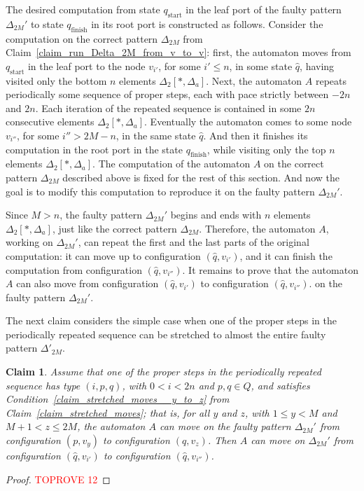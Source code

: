 \documentclass[12pt,a4paper]{article}
\newtheorem{claim}{Claim}
\theoremstyle{definition}
\begin{document}
The desired computation
from state $q_{\text{start}}$ in the leaf port of the faulty pattern $\Delta_{2M}'$
to state $q_{\text{finish}}$ in its root port
is constructed as follows.
Consider the computation on the correct pattern $\Delta_{2M}$
from Claim~\ref{claim_run_Delta_2M_from_v_to_v}:
first, the automaton moves from $q_{\text{start}}$ in the leaf port
to the node $v_{i'}$, for some $i' \leqslant n$, in some state $\widehat{q}$,
having visited only the bottom $n$ elements $\Delta_2[*,\Delta_a]$.
Next, the automaton $A$ repeats periodically
some sequence of proper steps, each with pace strictly between $-2n$ and $2n$.
Each iteration of the repeated sequence
is contained in some $2n$ consecutive elements $\Delta_2[*,\Delta_a]$.
Eventually the automaton comes to some node $v_{i''}$, for some $i'' > 2M-n$, in the same state $\widehat{q}$.
And then it finishes its computation
in the root port in the state $q_{\text{finish}}$,
while visiting only the top $n$ elements $\Delta_2[*,\Delta_a]$.
The computation of the automaton $A$ on the correct pattern $\Delta_{2M}$ described above
is fixed for the rest of this section.
And now the goal is to modify this computation
to reproduce it on the faulty pattern $\Delta_{2M}'$.

Since $M > n$, the faulty pattern $\Delta_{2M}'$
begins and ends with $n$ elements $\Delta_2[*,\Delta_a]$,
just like the correct pattern $\Delta_{2M}$.
Therefore, the automaton $A$, working on $\Delta_{2M}'$,
can repeat the first and the last parts of the original computation:
it can move up to configuration $(\widehat{q},v_{i'})$,
and it can finish the computation from configuration $(\widehat{q},v_{i''})$.
It remains to prove that the automaton $A$
can also move from configuration $(\widehat{q},v_{i'})$
to configuration $(\widehat{q},v_{i''})$.
on the faulty pattern $\Delta_{2M}'$.

The next claim considers the simple case
when one of the proper steps in the periodically repeated sequence
can be stretched to almost the entire faulty pattern $\Delta'_{2M}$.

\begin{claim} \label{claim_eliminating_yz_case}
Assume that one of the proper steps in the periodically repeated sequence
has type $(i,p,q)$, with $0 < i < 2n$ and $p,q \in Q$,
and satisfies Condition~\ref{claim_stretched_moves__y_to_z}
from Claim~\ref{claim_stretched_moves};
that is, for all $y$ and $z$,
with $1 \leqslant y < M$ and $M+1 < z \leqslant 2M$,
the automaton $A$ can move on the faulty pattern $\Delta_{2M}'$
from configuration $(p, v_y)$ to configuration $(q,v_z)$.
Then $A$ can move on $\Delta_{2M}'$
from configuration $(\widehat{q},v_{i'})$
to configuration $(\widehat{q},v_{i''})$.
\end{claim}
\begin{proof}\textcolor{red}{TOPROVE 12}\end{proof}
\end{document}
